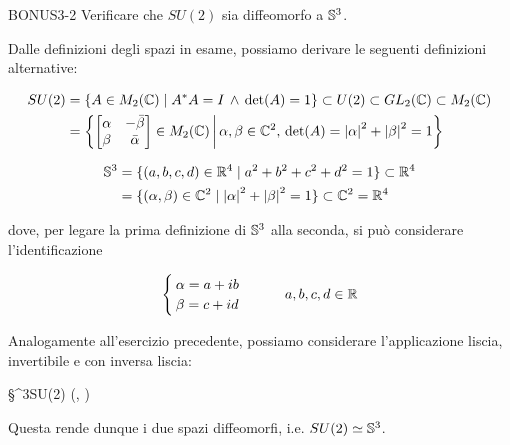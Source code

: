 {BONUS3-2}
{
Verificare che $ SU(2) $ sia diffeomorfo a $ \S^{3} $.
}
{
Dalle definizioni degli spazi in esame, possiamo derivare le seguenti definizioni alternative:

\begin{align}
	\begin{split}
		SU(2) &= \{ A \in M_{2}(\C) \mid A^{*} A = I \, \wedge \, \det(A) = 1 \} \subset U(2) \subset GL_{2}(\C) \subset M_{2}(\C) \\
		&= \left\{ \bmqty{ \alpha & - \bar{\beta} \\ \beta & \bar{\alpha} } \in M_{2}(\C) \st \alpha, \beta \in \C^{2}, \, \det(A) = \abs{\alpha}^{2} + \abs{\beta}^{2} = 1 \right\}
	\end{split}
\end{align}

\begin{align}
	\begin{split}
		\S^{3} &= \{ (a,b,c,d) \in \R^{4} \mid a^{2} + b^{2} + c^{2} + d^{2} = 1 \} \subset \R^{4} \\
		&= \{ (\alpha, \beta) \in \C^{2} \mid \abs{\alpha}^{2} + \abs{\beta}^{2} = 1 \} \subset \C^{2} = \R^{4}
	\end{split}
\end{align}

dove, per legare la prima definizione di $ \S^{3} $ alla seconda, si può considerare l'identificazione

\begin{equation}
	\begin{cases}
		\alpha = a + i b \\
		\beta = c + i d
	\end{cases} %
	\qquad a,b,c,d \in \R
\end{equation}

Analogamente all'esercizio precedente, possiamo considerare l'applicazione liscia, invertibile e con inversa liscia:

\map{\varphi}
	{\S^{3}}{SU(2)}
	{(\alpha, \beta)}{\bmqty{ \alpha & \beta \\ - \bar{\beta} & \bar{\alpha} }}

Questa rende dunque i due spazi diffeomorfi, i.e. $ SU(2) \simeq \S^{3} $.
}


